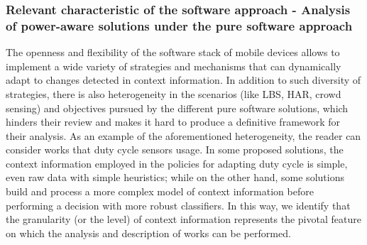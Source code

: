 \documentclass[ENG,PhD]{cinvestav}
\begin{document}
\subsubsection{Relevant characteristic of the software approach - Analysis of power-aware solutions under the pure software approach}
The openness and flexibility of the software stack of mobile devices allows to implement a wide variety of strategies and mechanisms that can dynamically adapt to changes detected in context information.
In addition to such diversity of strategies, there is also heterogeneity in the scenarios (like LBS, HAR, crowd sensing) and objectives pursued by the different pure software solutions, which hinders their review and makes it hard to produce a definitive framework for their analysis.
As an example of the aforementioned heterogeneity, the reader can consider works that duty cycle sensors usage.
In some proposed solutions, the context information employed in the policies for adapting duty cycle is simple, even raw data with simple heuristics; while on the other hand, some solutions build and process a more complex model of context information before performing a decision with more robust classifiers.
In this way, we identify that the granularity (or the level) of context information represents the pivotal feature on which the analysis and description of works can be performed.
\end{document}

